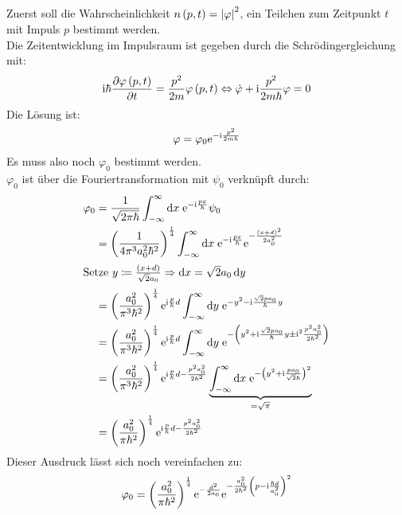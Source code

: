 \documentclass[11pt, ngerman, fleqn, DIV=15, headinclude]{scrartcl}
\begin{document}
\subsection{}

Zuerst soll die Wahrscheinlichkeit $n\left( p,t \right)=\left| \varphi \right|^2$, ein Teilchen zum Zeitpunkt $t$ mit Impuls $p$ bestimmt werden.\\
Die Zeitentwicklung im Impulsraum ist gegeben durch die Schrödingergleichung mit:
\begin{align*}
	\mathrm i\hbar\frac{\partial {\varphi\left( p,t \right)}}{\partial {t}}=\frac{p^2}{2m}\varphi\left( p,t \right) \Leftrightarrow \dot{\varphi}+\mathrm i\frac{p^2}{2m\hbar}\varphi=0
\end{align*}
Die Lösung ist:
\begin{align*}
	\varphi=\varphi_0\mathrm e^{-\mathrm i\frac{p^2}{2m\hbar}}
\end{align*}
Es muss also noch $\varphi_0$ bestimmt werden.\\
$\varphi_0$ ist über die Fouriertransformation mit $\psi_0$ verknüpft durch:
\begin{align*}
	\varphi_0 	&= \frac1{\sqrt{2\pi\hbar}}\int_{-\infty}^{\infty}\dif x\;\eup^{-\iup\frac{px}{\hbar}}\psi_0\\
				&= \del{\frac1{4\pi^3a_0^2\hbar^2}}^{\frac14}\int_{-\infty}^{\infty}\dif x\; \eup^{-\iup\frac{px}{\hbar}}\eup^{-\frac{\del{x+d}^2}{2a_0^2}}\\
	\intertext{%
		Setze $y\coloneqq\frac{\del{x+d}}{\sqrt{2}a_0}\Rightarrow \dif x=\sqrt{2}a_0\dif y$
	}
				&= \del{\frac{a_0^2}{\pi^3\hbar^2}}^{\frac14}\eup^{\iup\frac{p}{\hbar}d}\int_{-\infty}^{\infty}\dif y\; \eup^{-y^2-\iup\frac{\sqrt2pa_0}{\hbar}y}\\
				&= \del{\frac{a_0^2}{\pi^3\hbar^2}}^{\frac14}\eup^{\iup\frac{p}{\hbar}d}\int_{-\infty}^{\infty}\dif y\; \eup^{-\del{y^2+\iup\frac{\sqrt2pa_0}{\hbar}y\pm\iup^2\frac{p^2a_0^2}{2\hbar^2}}}\\
				&= \del{\frac{a_0^2}{\pi^3\hbar^2}}^{\frac14}\eup^{\iup\frac{p}{\hbar}d-\frac{p^2a_0^2}{2\hbar^2}}\underbrace{\int_{-\infty}^{\infty}\dif x\; \eup^{-\del{y^2+\iup\frac{pa_0}{\sqrt2\hbar}}^2}}_{=\sqrt{\pi}}\\
				&= \del{\frac{a_0^2}{\pi\hbar^2}}^{\frac14}\eup^{\iup\frac{p}{\hbar}d-\frac{p^2a_0^2}{2\hbar^2}}
\end{align*}
Dieser Ausdruck lässt sich noch vereinfachen zu:
\begin{align*}
	\varphi_0=\left( \frac{a_0^2}{\pi\hbar^2} \right)^{\frac14}\mathrm e^{-\frac{d^2}{2a_0}}\mathrm e^{-\frac{a_0^2}{2\hbar^2}\left( p-\mathrm i\frac{\hbar d}{a_0^2} \right)^2}
\end{align*}
\end{document}
